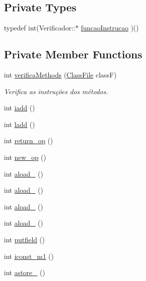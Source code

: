 \subsection*{Private Types}
\begin{DoxyCompactItemize}
\item 
typedef int(Verificador\+::$\ast$ \hyperlink{classVerificador_a2a64056e6634e64f586f2788b5685e5c}{funcao\+Instrucao} )()
\end{DoxyCompactItemize}
\subsection*{Private Member Functions}
\begin{DoxyCompactItemize}
\item 
int \hyperlink{classVerificador_a025ec61668a0fbe315b6318c61aa2460}{verifica\+Methods} (\hyperlink{classClassFile}{Class\+File} class\+F)
\begin{DoxyCompactList}\small\item\em Verifica as instruções dos métodos. \end{DoxyCompactList}\item 
int \hyperlink{classVerificador_aa67ba73d0f0df6286f65e45a78f8a3e5}{iadd} ()
\item 
int \hyperlink{classVerificador_a118c57abe0716ec633de37977677f51e}{ladd} ()
\item 
int \hyperlink{classVerificador_a196dbc5d4fdfbdf4f55a511f883e477b}{return\+\_\+op} ()
\item 
int \hyperlink{classVerificador_a4e5b8d6eeedff3ae91ec74a53ffb1cff}{new\+\_\+op} ()
\item 
int \hyperlink{classVerificador_aa9f6694a5b737841c91f034a6496a1ae}{aload\+\_} ()
\item 
int \hyperlink{classVerificador_ae36056fb3152a532ddea76e576a1b7f1}{aload\+\_} ()
\item 
int \hyperlink{classVerificador_a61eaaf6714bacd93a2d76e61db2b3550}{aload\+\_} ()
\item 
int \hyperlink{classVerificador_a3a3c7f78a3d7fafbc0ab4736ef83753f}{aload\+\_} ()
\item 
int \hyperlink{classVerificador_ae0a45c6f991ec71424e25015b48f2667}{putfield} ()
\item 
int \hyperlink{classVerificador_a3fd3e7ee5dc1e62ec16793b9d4134a60}{iconst\+\_\+m1} ()
\item 
int \hyperlink{classVerificador_ac421525ab4efa0a7ffc769e4ddb5c3b9}{astore\+\_} ()
\item 

\end{DoxyCompactItemize}
